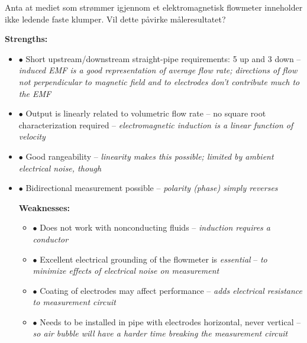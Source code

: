 \begin{itemize}
\begin{itemize}
\vskip 10pt

Anta at mediet som strømmer igjennom et elektromagnetisk flowmeter inneholder ikke ledende faste klumper. Vil dette påvirke måleresultatet? 

\vskip 10pt














{\bf Strengths:}

\begin{itemize}
\item{$\bullet$} Short upstream/downstream straight-pipe requirements: 5 up and 3 down -- {\it induced EMF is a good representation of average flow rate; directions of flow not perpendicular to magnetic field and to electrodes don't contribute much to the EMF}
\item{$\bullet$} Output is linearly related to volumetric flow rate -- no square root characterization required -- {\it electromagnetic induction is a linear function of velocity}
\item{$\bullet$} Good rangeability -- {\it linearity makes this possible; limited by ambient electrical noise, though}
\item{$\bullet$} Bidirectional measurement possible -- {\it polarity (phase) simply reverses}
\medskip

\vskip 10pt

{\bf Weaknesses:}

\begin{itemize}
\item{$\bullet$} Does not work with nonconducting fluids -- {\it induction requires a conductor}
\item{$\bullet$} Excellent electrical grounding of the flowmeter is {\it essential} -- {\it to minimize effects of electrical noise on measurement}
\item{$\bullet$} Coating of electrodes may affect performance -- {\it adds electrical resistance to measurement circuit}
\item{$\bullet$} Needs to be installed in pipe with electrodes horizontal, never vertical -- {\it so air bubble will have a harder time breaking the measurement circuit}
\medskip


\end{itemize}
\end{itemize}
\end{itemize}
\end{itemize}
